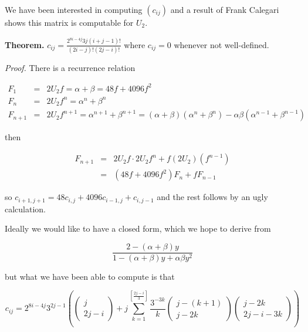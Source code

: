 \documentclass[12pt]{article}
\begin{document}
\medskip

We have been interested in computing $(c_{ij})$ and a result of Frank
Calegari shows this matrix is computable for $U_{2}$.

\medskip

\noindent \textbf{Theorem.} $\displaystyle c_{ij} = \frac{2^{8i-4j}3j(i+j
-1)!}{(2i-j)!(2j-i)!}$ where $c_{ij} = 0$ whenever not well-defined.

\smallskip

\textit{Proof.}  There is a recurrence relation 

\begin{eqnarray*}
F_{1}   & = & 2U_{2}f = \alpha + \beta = 48f + 4096f^{2} \\
F_{n}   & = & 2U_{2}f^{n} = \alpha^{n} + \beta^{n} \\
F_{n+1} & = & 2U_{2}f^{n+1} = \alpha^{n+1} + \beta^{n+1} = (\alpha +
\beta)(\alpha^{n} + \beta^{n}) - \alpha \beta(\alpha^{n-1} + \beta^{n-1}) 
\end{eqnarray*}

\noindent then 

\begin{eqnarray*}
F_{n+1} & = & 2U_{2}f \cdot 2U_{2}f^{n} + f(2U_{2})(f^{n-1}) \\
        & = & (48f + 4096f^{2})F_{n} + fF_{n-1}
\end{eqnarray*}

\noindent so $c_{i+1,j+1} = 48c_{i,j} + 4096c_{i-1,j} + c_{i,j-1}$ and the
rest follows by an ugly calculation.

\medskip

Ideally we would like to have a closed form, which we hope to derive from 

\[\frac{2 - (\alpha + \beta)y}{1 - (\alpha + \beta)y + \alpha \beta y^{2}}
\]

\noindent but what we have been able to compute is that 
 
\[c_{ij} = 2^{8i - 4j}3^{2j-1}\left( \left( \begin{array}{c} j \\ 2j - i
\end{array} \right)  
 + j\sum_{k=1}^{[\frac{2j-i}{3}]} \frac{3^{-3k}}{k} \left( \begin{array}{c}
j - (k+1) \\ j - 2k \end{array} \right) \left( \begin{array}{c} j - 2k \\ 2j
- i - 3k \end{array} \right) \right) \]
\end{document}
